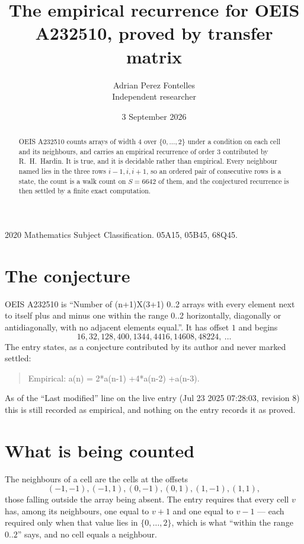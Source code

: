 \documentclass[11pt,a4paper]{article}
\title{The empirical recurrence for OEIS A232510, proved by transfer matrix}
\author{Adrian Perez Fontelles\\ \small Independent researcher}
\date{3 September 2026}
\theoremstyle{plain}
\theoremstyle{definition}
\begin{document}
\maketitle

\begin{abstract}
OEIS A232510 counts arrays of width $4$ over $\{0,\dots,2\}$ under a condition on each cell
and its neighbours, and carries an empirical recurrence of order $3$ contributed by
R.~H.~Hardin. It is true, and it is decidable rather than empirical. Every neighbour named lies
in the three rows $i-1,i,i+1$, so an ordered pair of consecutive rows is a state, the count is
a walk count on $S=6642$ of them, and the conjectured recurrence is then settled by a finite
exact computation.
\end{abstract}

\noindent\small 2020 Mathematics Subject Classification. 05A15, 05B45, 68Q45.\normalsize

\section{The conjecture}

OEIS A232510 is ``Number of (n+1)X(3+1) 0..2 arrays with every element next to itself plus and minus one within the range 0..2 horizontally, diagonally or antidiagonally, with no adjacent elements equal.''. It has offset $1$ and begins
\[
16, 32, 128, 400, 1344, 4416, 14608, 48224,\ \dots
\]
The entry states, as a conjecture contributed by its author and never marked settled:
\begin{quote}
Empirical: a(n) = 2*a(n-1) +4*a(n-2) +a(n-3).
\end{quote}
As of the ``Last modified'' line on the live entry (Jul 23 2025 07:28:03, revision 8) this is still
recorded as empirical, and nothing on the entry records it as proved.

\section{What is being counted}

The neighbours of a cell are the cells at the offsets
\[
(-1,-1), (-1,1), (0,-1), (0,1), (1,-1), (1,1),
\]
those falling outside the array being absent. The entry requires that every cell $v$ has, among its neighbours, one equal to $v+1$ and one equal to $v-1$ --- each required only when that value lies in $\{0,\dots,2\}$, which is what ``within the range $0..2$'' says, and no cell equals a neighbour.
\end{document}
